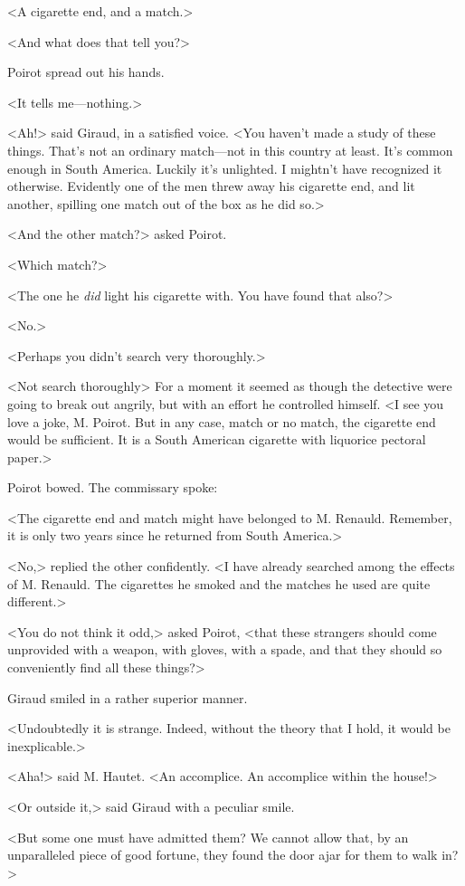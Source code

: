  <A cigarette end, and a match.> 

 <And what does that tell you?> 

 Poirot spread out his hands. 

 <It tells me—nothing.> 

 <Ah!> said Giraud, in a satisfied voice. <You haven't made a study of these things. That's not an ordinary match—not in this country at least. It's common enough in South America. Luckily it's unlighted. I mightn't have recognized it otherwise. Evidently one of the men threw away his cigarette end, and lit another, spilling one match out of the box as he did so.> 

 <And the other match?> asked Poirot. 

 <Which match?> 

 <The one he \emph{did} light his cigarette with. You have found that also?> 

 <No.> 

 <Perhaps you didn't search very thoroughly.> 

 <Not search thoroughly\longdash> For a moment it seemed as though the detective were going to break out angrily, but with an effort he controlled himself. <I see you love a joke, M. Poirot. But in any case, match or no match, the cigarette end would be sufficient. It is a South American cigarette with liquorice pectoral paper.> 

 Poirot bowed. The commissary spoke: 

 <The cigarette end and match might have belonged to M. Renauld. Remember, it is only two years since he returned from South America.> 

 <No,> replied the other confidently. <I have already searched among the effects of M. Renauld. The cigarettes he smoked and the matches he used are quite different.> 

 <You do not think it odd,> asked Poirot, <that these strangers should come unprovided with a weapon, with gloves, with a spade, and that they should so conveniently find all these things?> 

 Giraud smiled in a rather superior manner. 

 <Undoubtedly it is strange. Indeed, without the theory that I hold, it would be inexplicable.> 

 <Aha!> said M. Hautet. <An accomplice. An accomplice within the house!> 

 <Or outside it,> said Giraud with a peculiar smile. 

 <But some one must have admitted them? We cannot allow that, by an unparalleled piece of good fortune, they found the door ajar for them to walk in?> 

